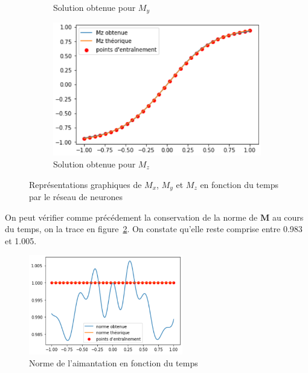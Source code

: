 \documentclass[12pt]{report}
\begin{document}
\begin{figure}
\begin{subfigure}[b]{0.4\textwidth}
        \caption{Solution obtenue pour $M_y$}
    \end{subfigure}
    \hfill
    \begin{subfigure}[c]{0.4\textwidth}
        \centering
        \includegraphics[width=1\textwidth, height=0.9\textwidth]{Mz_3NN.PNG}
        \caption{Solution obtenue pour $M_z$}
    \end{subfigure}
       \caption{Représentations graphiques de $M_x$, $M_y$ et $M_z$ en fonction du temps par le réseau de neurones}
       \label{fig:resultats_3NN}
\end{figure}

On peut vérifier comme précédement la conservation de la norme de $\bm M$ au cours du temps, on la trace en figure~\ref{fig:norme_de_M_3NN}. 
On constate qu'elle reste comprise entre 0.983 et 1.005.

\begin{figure}
    \centering
    \includegraphics[width=0.6\textwidth]{Norm_3NN.PNG}
    \caption{Norme de l'aimantation en fonction du temps}
    \label{fig:norme_de_M_3NN}
\end{figure}
    
\end{document}

